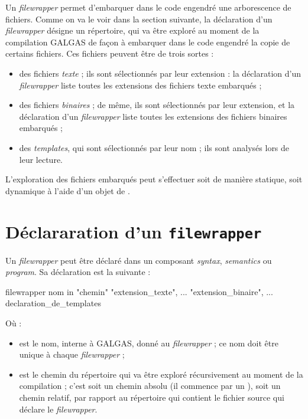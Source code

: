 

Un \emph{filewrapper} permet d'embarquer dans le code engendré une arborescence de fichiers. Comme on va le voir dans la section suivante, la déclaration d'un \emph{filewrapper} désigne un répertoire, qui va être exploré au moment de la compilation GALGAS de façon à embarquer dans le code engendré la copie de certains fichiers. Ces  fichiers peuvent être de trois sortes :
\begin{itemize}
  \item des fichiers \emph{texte} ; ils sont sélectionnés par leur extension : la déclaration d'un \emph{filewrapper} liste toutes les extensions des fichiers texte embarqués ;
  \item des fichiers \emph{binaires} ; de même, ils sont sélectionnés par leur extension, et la déclaration d'un \emph{filewrapper} liste toutes les extensions des fichiers binaires embarqués ;
  \item des \emph{templates}, qui sont sélectionnés par leur nom ; ils sont analysés lors de leur lecture.
\end{itemize}


L'exploration des fichiers embarqués peut s'effectuer soit de manière statique, soit dynamique à l'aide d'un objet de .









\section{Déclararation d'un \texttt{filewrapper}}

Un \emph{filewrapper} peut être déclaré dans un composant \emph{syntax}, \emph{semantics} ou \emph{program}. Sa déclaration est la suivante :

\begin{galgascode}
filewrapper nom in "chemin" {
 "extension_texte", ...
}{
 "extension_binaire", ...
}{
 declaration_de_templates
}
\end{galgascode}

Où :
\begin{itemize}
  \item {} est le nom, interne à GALGAS, donné au \emph{filewrapper} ; ce nom doit être unique à chaque \emph{filewrapper} ;
  \item {} est le chemin du répertoire qui va être exploré récursivement au moment de la compilation ; c'est soit un chemin absolu (il commence par un \galgas{/}), soit un chemin relatif, par rapport au répertoire qui contient le fichier source qui déclare le \emph{filewrapper}.
\end{itemize}

